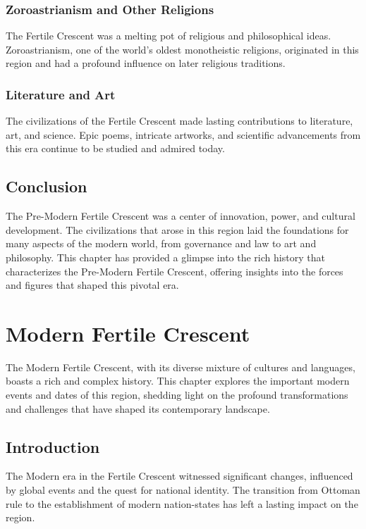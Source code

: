 \documentclass{book}
\begin{document}
\subsection{Zoroastrianism and Other Religions}
The Fertile Crescent was a melting pot of religious and philosophical ideas. Zoroastrianism, one of the world’s oldest monotheistic religions, originated in this region and had a profound influence on later religious traditions.

\subsection{Literature and Art}
The civilizations of the Fertile Crescent made lasting contributions to literature, art, and science. Epic poems, intricate artworks, and scientific advancements from this era continue to be studied and admired today.

\section{Conclusion}
\label{sec:conclusion-fertile-crescent}

The Pre-Modern Fertile Crescent was a center of innovation, power, and cultural development. The civilizations that arose in this region laid the foundations for many aspects of the modern world, from governance and law to art and philosophy. This chapter has provided a glimpse into the rich history that characterizes the Pre-Modern Fertile Crescent, offering insights into the forces and figures that shaped this pivotal era.

\chapter{Modern Fertile Crescent}
\label{ch:modern-fertile-crescent}

The Modern Fertile Crescent, with its diverse mixture of cultures and languages, boasts a rich and complex history. This chapter explores the important modern events and dates of this region, shedding light on the profound transformations and challenges that have shaped its contemporary landscape.

\section{Introduction}
\label{sec:introduction-modern-fertile-crescent}

The Modern era in the Fertile Crescent witnessed significant changes, influenced by global events and the quest for national identity. The transition from Ottoman rule to the establishment of modern nation-states has left a lasting impact on the region.
\end{document}
